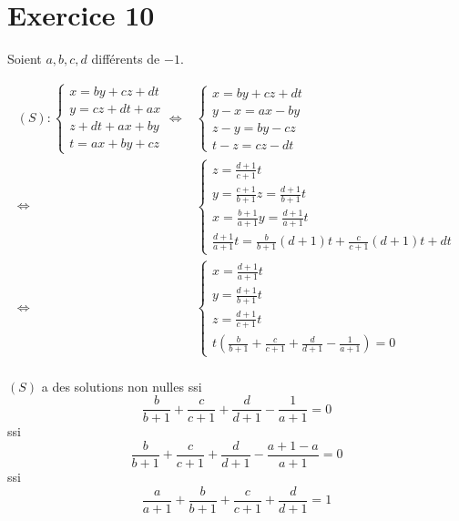 \part{Exercice 10}

Soient $a,b,c,d$ différents de $-1$.

\begin{align*}
	(S):
	\begin{cases}
		x = by + cz + dt\\
		y = cz + dt + ax\\
		z + dt + ax + by\\
		t = ax + by + cz
	\end{cases}
	\iff
	&\begin{cases}
		x = by + cz+dt\\
		y-x = ax-by\\
		z-y = by - cz\\
		t-z = cz - dt
	\end{cases}\\
	\iff& \begin{cases}
		z = \frac{d+1}{c+1}t\\
		y = \frac{c+1}{b+1}z=\frac{d+1}{b+1}t\\
		x = \frac{b+1}{a+1}y = \frac{d+1}{a+1}t\\
		\frac{d+1}{a+1}t = \frac{b}{b+1}(d+1)t + \frac{c}{c+1}(d+1)t + dt
	\end{cases}\\
	\iff&
	\begin{cases}
		x = \frac{d+1}{a+1}t\\
		y = \frac{d+1}{b+1}t\\
		z = \frac{d+1}{c+1}t\\
		t\left( \frac{b}{b+1}+\frac{c}{c+1}+\frac{d}{d+1}-\frac{1}{a+1} \right) =0
	\end{cases}\\
\end{align*}

$(S)$ a des solutions non nulles ssi \[
	\frac{b}{b+1}+\frac{c}{c+1}+\frac{d}{d+1}-\frac{1}{a+1} = 0
\] ssi \[
	\frac{b}{b+1}+\frac{c}{c+1}+\frac{d}{d+1}-\frac{a+1-a}{a+1} = 0
\] ssi \[
	\frac{a}{a+1}+\frac{b}{b+1}+\frac{c}{c+1}+\frac{d}{d+1} = 1
\]
